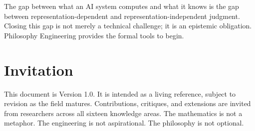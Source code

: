 \documentclass[12pt,letterpaper]{article}
\theoremstyle{definition}
\theoremstyle{plain}
\begin{document}
The gap between what an AI system computes and what it knows is the gap between representation-dependent and representation-independent judgment. Closing this gap is not merely a technical challenge; it is an epistemic obligation. Philosophy Engineering provides the formal tools to begin.

\section{Invitation}

This document is Version 1.0. It is intended as a living reference, subject to revision as the field matures. Contributions, critiques, and extensions are invited from researchers across all sixteen knowledge areas. The mathematics is not a metaphor. The engineering is not aspirational. The philosophy is not optional.



\end{document}

